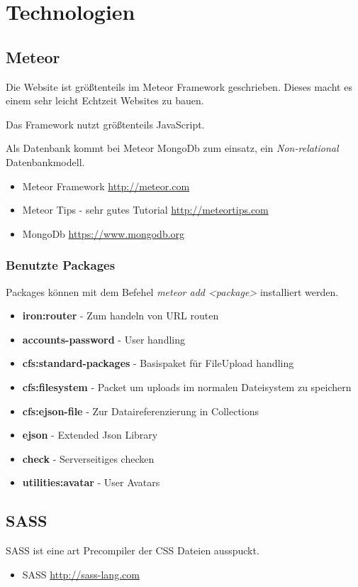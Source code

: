 \documentclass[Info_VK_Website_Dokumentation.tex]{subfiles}
\begin{document}
	
\chapter{Technologien}

\section{Meteor} 

Die Website ist größtenteils im Meteor Framework geschrieben. Dieses macht es einem sehr leicht Echtzeit Websites zu bauen.

Das Framework nutzt größtenteils JavaScript.

Als Datenbank kommt bei Meteor MongoDb zum einsatz, ein \emph{Non-relational} Datenbankmodell.

\begin{itemize}
 	\item Meteor Framework \url{http://meteor.com} \\
 	\item Meteor Tips - sehr gutes Tutorial \url{http://meteortips.com} \\
 	\item MongoDb \url{https://www.mongodb.org} \\ 
\end{itemize} 

\subsection{Benutzte Packages}

Packages können mit dem Befehel \emph{meteor add <package>} installiert werden.

\begin{itemize}
 	\item \textbf{iron:router} - Zum handeln von URL routen \\
 	\item \textbf{accounts-password} - User handling \\
 	\item \textbf{cfs:standard-packages} - Basispaket für FileUpload handling \\
 	\item \textbf{cfs:filesystem} - Packet um uploads im normalen Dateisystem zu speichern \\
 	\item \textbf{cfs:ejson-file} - Zur Dataireferenzierung in Collections \\
 	\item \textbf{ejson} - Extended Json Library \\
 	\item \textbf{check} - Serverseitiges checken \\
 	\item \textbf{utilities:avatar} - User Avatars \\
 \end{itemize} 

\section{SASS}

SASS ist eine art Precompiler der CSS Dateien ausspuckt.

\begin{itemize}
	\item SASS \url{http://sass-lang.com} 
\end{itemize}
\end{document}
